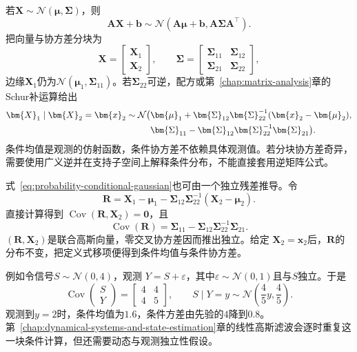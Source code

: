 若\(\bm{X}\sim\mathcal{N}(\bm{\mu},\bm{\Sigma})\)，则
\[ \bm{A}\bm{X}+\bm{b}
  \sim\mathcal{N}(\bm{A}\bm{\mu}+\bm{b},\bm{A}\bm{\Sigma}\bm{A}^{\top}). \]
把向量与协方差分块为
\[
  \bm{X}=
  \begin{bmatrix}\bm{X}_1\\\bm{X}_2\end{bmatrix},
  \qquad
  \bm{\Sigma}=
  \begin{bmatrix}
    \bm{\Sigma}_{11}&\bm{\Sigma}_{12}\\
    \bm{\Sigma}_{21}&\bm{\Sigma}_{22}
  \end{bmatrix},
\]
边缘\(\bm{X}_1\)仍为\(\mathcal{N}(\bm{\mu}_1,\bm{\Sigma}_{11})\)。若\(\bm{\Sigma}_{22}\)可逆，配方或第~\ref{chap:matrix-analysis}章的Schur补运算给出
\begin{align}
  \bm{X}_1\mid\bm{X}_2=\bm{x}_2
  \sim\mathcal{N}\bigl(
  &\bm{\mu}_1+
  \bm{\Sigma}_{12}\bm{\Sigma}_{22}^{-1}
  (\bm{x}_2-\bm{\mu}_2),\notag\\
  &\bm{\Sigma}_{11}
  -\bm{\Sigma}_{12}\bm{\Sigma}_{22}^{-1}
  \bm{\Sigma}_{21}
  \bigr).
  \label{eq:probability-conditional-gaussian}
\end{align}
条件均值是观测的仿射函数，条件协方差不依赖具体观测值。若分块协方差奇异，需要使用广义逆并在支持子空间上解释条件分布，不能直接套用逆矩阵公式。

式~\eqref{eq:probability-conditional-gaussian}也可由一个独立残差推导。令
\[
  \bm{R}
  =\bm{X}_1-\bm{\mu}_1
   -\bm{\Sigma}_{12}\bm{\Sigma}_{22}^{-1}
    (\bm{X}_2-\bm{\mu}_2).
\]
直接计算得到
\(\operatorname{Cov}(\bm{R},\bm{X}_2)=\bm{0}\)，且
\[
  \operatorname{Cov}(\bm{R})
  =\bm{\Sigma}_{11}
   -\bm{\Sigma}_{12}\bm{\Sigma}_{22}^{-1}\bm{\Sigma}_{21}.
\]
\((\bm{R},\bm{X}_2)\)是联合高斯向量，零交叉协方差因而推出独立。给定
\(\bm{X}_2=\bm{x}_2\)后，\(\bm{R}\)的分布不变，把定义式移项便得到条件均值与条件协方差。

例如令信号\(S\sim\mathcal{N}(0,4)\)，观测
\(Y=S+\varepsilon\)，其中\(\varepsilon\sim\mathcal{N}(0,1)\)且与\(S\)独立。于是
\[
  \operatorname{Cov}
  \begin{pmatrix}S\\Y\end{pmatrix}
  =
  \begin{bmatrix}4&4\\4&5\end{bmatrix},
  \qquad
  S\mid Y=y\sim\mathcal{N}\left(\frac45y,\frac45\right).
\]
观测到\(y=2\)时，条件均值为\(1.6\)，条件方差由先验的\(4\)降到\(0.8\)。第~\ref{chap:dynamical-systems-and-state-estimation}章的线性高斯滤波会逐时重复这一块条件计算，但还需要动态与观测独立性假设。

